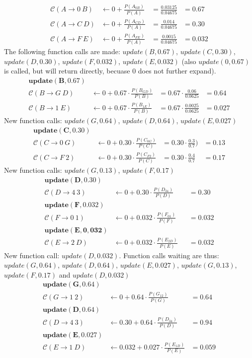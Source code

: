 \documentclass{article}
\newcommand{\C}{\mathcal{C}}
\begin{document}
\begin{align*}
\C(A\rightarrow 0~B) &\leftarrow 0 + \frac{P(A_{0B})}{P(A)} &= \frac{0.03125}{0.04675} &= 0.67\\
\C(A\rightarrow C~D) &\leftarrow 0 + \frac{P(A_{CD})}{P(A)} &= \frac{0.014}{0.04675} &= 0.30\\
\C(A\rightarrow F~E) &\leftarrow 0 + \frac{P(A_{FE})}{P(A)} &= \frac{0.0015}{0.04675} &= 0.032
\end{align*}
The following function calls are made: $update(B,0.67)$, $update(C,0.30)$, $update(D,0.30)$, $update(F,0.032)$, $update(E,0.032)$ (also $update(0,0.67)$ is called, but will return directly, becuase $0$ does not further expand).
\begin{align*}
\mathbf{update(B,0.67)}\\
\C(B\rightarrow G~D) &\leftarrow 0 + 0.67\cdot\frac{P(B_{GD})}{P(B)} &= 0.67 \cdot\frac{0.06}{0.0625} &= 0.64\\
\C(B\rightarrow 1~E) &\leftarrow 0 + 0.67\cdot\frac{P(B_{1E})}{P(B)} &= 0.67\cdot \frac{0.0025}{0.0625} &= 0.027
\end{align*}
New function calls: $update(G,0.64)$, $update(D,0.64)$, $update(E,0.027)$
\begin{align*}
\mathbf{update(C,0.30)}\\
\C(C\rightarrow 0~G) &\leftarrow 0 + 0.30\cdot\frac{P(C_{0G})}{P(C)} &= 0.30\cdot\frac{0.3}{0.7}) &= 0.13\\
\C(C\rightarrow F~2) &\leftarrow 0 + 0.30\cdot\frac{P(C_{F2})}{P(C)} &= 0.30\cdot\frac{0.4}{0.7} &= 0.17
\end{align*}
New function calls: $update(G,0.13)$, $update(F,0.17)$
\begin{align*}
\mathbf{update(D,0.30)}\\
\C(D\rightarrow 4~3) &\leftarrow 0 + 0.30\cdot \frac{P(D_{34})}{P(D)} &  &= 0.30\\
\mathbf{update(F,0.032)}\\
\C(F\rightarrow 0~1) &\leftarrow 0 + 0.032\cdot \frac{P(F_{01})}{P(F)} &&= 0.032\\
\mathbf{update(E,0,032)}\\
\C(E\rightarrow 2~D) &\leftarrow 0 + 0.032\cdot \frac{P(E_{2D})}{P(E)} &&= 0.032
\end{align*}
New function call: $update(D,0.032)$. Function calls waiting are thus: $update(G,0.64)$, $update(D,0.64)$, $update(E,0.027)$, $update(G,0.13)$, $update(F,0.17)$ and $update(D,0.032)$
\begin{align*}
\mathbf{update(G,0.64)}\\
\C(G\rightarrow 1~2) &\leftarrow 0 + 0.64 \cdot \frac{P(G_{12})}{P(G)} &= 0.64\\
\mathbf{update(D,0.64)}\\
\C(D\rightarrow 4~3) &\leftarrow 0.30 + 0.64\cdot \frac{P(D_{34})}{P(D)} &= 0.94\\
\mathbf{update(E,0.027)}\\
\C(E\rightarrow 1~D) &\leftarrow 0.032 + 0.027\cdot \frac{P(E_{1D})}{P(E)} &= 0.059
\end{align*}
\end{document}
